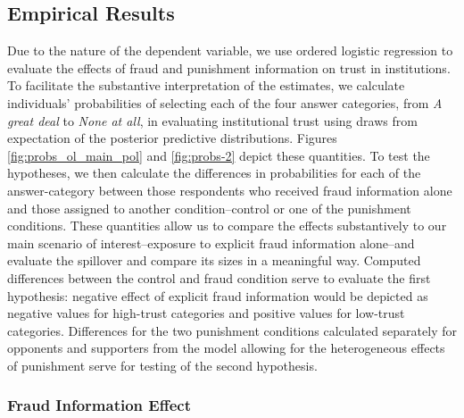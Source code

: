 \documentclass[11pt, ngerman,english,a4]{article}
\begin{document}
\subsection*{Empirical Results}

Due to the nature of the dependent variable, we use ordered logistic regression to evaluate the effects of fraud and punishment information on trust in institutions. 
To facilitate the substantive interpretation of the estimates, we calculate individuals' probabilities of selecting each of the four answer categories, from \textit{A great deal} to \textit{None at all}, in evaluating institutional trust using draws from expectation of the posterior predictive distributions. Figures \ref{fig:probs_ol_main_pol} and \ref{fig:probs-2} depict these quantities. 
To test the hypotheses, we then calculate the differences in probabilities for each of the answer-category between those respondents who received fraud information alone and those assigned to another condition--control or one of the punishment conditions. 
These quantities allow us to compare the effects substantively to our main scenario of interest--exposure to explicit fraud information alone--and evaluate the spillover and compare its sizes in a meaningful way. 
Computed differences between the control and fraud condition serve to evaluate the first hypothesis: negative effect of explicit fraud information would be depicted as negative values for high-trust categories and positive values for low-trust categories. 
Differences for the two punishment conditions calculated separately for opponents and supporters from the model allowing for the heterogeneous effects of punishment serve for testing of the second hypothesis. 

\subsubsection*{Fraud Information Effect}




\end{document}
